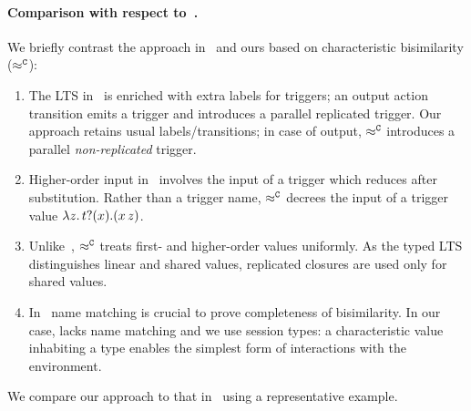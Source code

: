 \paragraph{Comparison with respect to~\cite{JeffreyR05}.} 
We briefly contrast 
the approach in~\cite{JeffreyR05} and ours based on 
characteristic  bisimilarity ($\approx^\mathtt{C}$):
\begin{enumerate}[$\bullet$]
\item 
The LTS in~\cite{JeffreyR05} is enriched with extra labels for triggers;
an output action transition emits a trigger and introduces a parallel replicated trigger.
Our 
approach retains usual labels/transitions; in  case of output,
$\approx^\mathtt{C}$
introduces a parallel
\emph{non-replicated} trigger.

\item Higher-order input in~\cite{JeffreyR05} involves 
the input of a trigger which reduces after substitution.
Rather than a trigger name, %
$\approx^\mathtt{C}$
decrees the input of a trigger value $\lambda z.\,t ? (x) . (x\, {z})$.

\item Unlike~\cite{JeffreyR05}, 
$\approx^\mathtt{C}$ treats  
first- and higher-order values uniformly. %
As the typed LTS distinguishes linear and shared values,
replicated closures are used only for shared values.

\item In~\cite{JeffreyR05}   name matching   is
crucial to prove completeness of bisimilarity.
In our case, \HOp lacks name matching and 
we use session types: a characteristic value inhabiting a type enables the simplest form of interactions with the environment.


\end{enumerate}
We compare our approach to that in~\cite{JeffreyR05} 
using a representative example.

